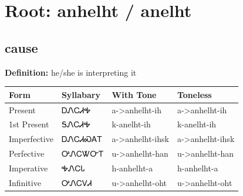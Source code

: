 \documentclass{article}%
\begin{document}
%
\normalsize%
\section*{Root: anhelht / anelht}%
\subsection*{cause}%
\textbf{Definition: }%
he/she is interpreting it%
\\[0.5em]%
\begin{tabular}{|l|l|l|l|}%
\hline%
\textbf{Form}&\textbf{Syllabary}&\textbf{With Tone}&\textbf{Toneless}\\%
\hline%
Present&ᎠᏁᏟᏗᎭ&a{-}>anhelht{-}ih&a{-}>anhelht{-}ih\\%
1st Present&ᎦᏁᏟᏗᎭ&k{-}anelht{-}ih&k{-}anelht{-}ih\\%
Imperfective&ᎠᏁᏟᏗᏍᎪᎢ&a{-}>anhelht{-}ihsk&a{-}>anhelht{-}ihsk\\%
Perfective&ᎤᏁᏟᏔᏅᎢ&u{-}>anhelht{-}han&u{-}>anhelht{-}han\\%
Imperative&ᎭᏁᏟᏓ&h{-}anhelht{-}a&h{-}anhelht{-}a\\%
Infinitive&ᎤᏁᏟᏙᏗ&u{-}>anhelht{-}oht&u{-}>anhelht{-}oht\\%
\hline%
\end{tabular}%
\\[1em]%
\end{document}
